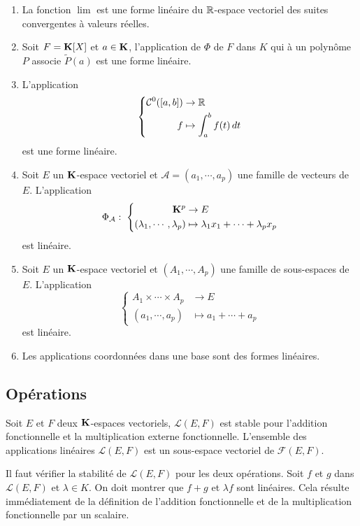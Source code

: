 \begin{exples}
\begin{enumerate}
 \item La fonction $\lim$ est une forme linéaire du $\mathbb{R}$-espace vectoriel des suites convergentes à valeurs réelles.
 \item Soit $F = \mathbf{K}[X]$ et $a\in \mathbf{K}$, l'application de $\Phi$ de $F$ dans $K$ qui à un polynôme $P$ associe $\widetilde{P}(a)$ est une forme linéaire.
 \item L'application
\begin{displaymath}
\left\lbrace \begin{aligned}
  \mathcal{C}^0([a,b]) &\rightarrow \mathbb{R} \\ f &\mapsto \int_a^bf(t)\,dt
\end{aligned}
\right. 
\end{displaymath}
est une forme linéaire.
 \item Soit $E$ un $\mathbf{K}$-espace vectoriel et $\mathcal{A} = (a_1,\cdots,a_p)$ une famille de vecteurs de $E$. L'application
\begin{displaymath}
\Phi_{\mathcal{A}}:\;
\left\lbrace 
\begin{aligned}
  \mathbf{K}^p &\rightarrow E \\ (\lambda_1,\cdots,\lambda_p) &\mapsto \lambda_1 x_1 + \cdots  + \lambda_p x_p
\end{aligned}
\right. 
\end{displaymath}
est linéaire.
 \item Soit $E$ un $\mathbf{K}$-espace vectoriel et $(A_1,\cdots,A_p)$ une famille de sous-espaces de $E$. L'application
\begin{displaymath}
\left\lbrace 
\begin{aligned}
  A_1\times \cdots \times A_p &\rightarrow E \\ (a_1,\cdots,a_p) &\mapsto a_1 + \cdots  + a_p
\end{aligned}
\right. 
\end{displaymath}
est linéaire.
 \item Les applications coordonnées dans une base sont des formes linéaires.
\end{enumerate}
\end{exples}


\subsection{Opérations}
\begin{prop}
Soit $E$ et $F$ deux $\mathbf{K}$-espaces vectoriels, $\mathcal{L}(E,F)$ est stable pour l'addition fonctionnelle et la multiplication externe fonctionnelle.\newline
L'ensemble des applications linéaires $\mathcal{L}(E,F)$ est un sous-espace vectoriel de $\mathcal{F}(E,F)$.
\end{prop}
\begin{demo}
  Il faut vérifier la stabilité de $\mathcal{L}(E,F)$ pour les deux opérations. Soit $f$ et $g$ dans $\mathcal{L}(E,F)$ et $\lambda \in K$. On doit montrer que $f+g$ et $\lambda f$ sont linéaires. Cela résulte immédiatement de la définition de l'addition fonctionnelle et de la multiplication fonctionnelle par un scalaire.
\end{demo}

